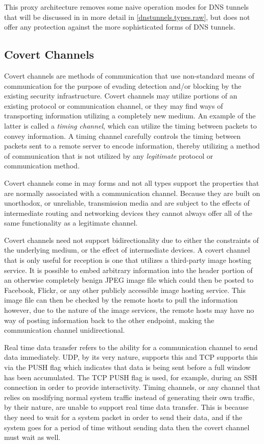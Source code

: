 \documentclass[12pt]{article}
\theoremstyle{remark}
\theoremstyle{definition}
\theoremstyle{definition}
\theoremstyle{definition}
\begin{document}
This proxy architecture removes some naive operation modes for DNS tunnels
that will be discussed in in more detail in \ref{dnstunnels.types.raw}, but does
not offer any protection against the more sophisticated forms of DNS tunnels.

\subsection{Covert Channels}

Covert channels are methods of communication that use non-standard means of
communication for the purpose of evading detection and/or blocking by the
existing security infrastructure. Covert channels may utilize
portions of an existing protocol or communication channel, or they may find
ways of transporting information utilizing a completely new medium. An example
of the latter is called a \emph{timing channel}, which can utilize the timing
between packets to convey information. A timing channel carefully controls the
timing between packets sent to a remote server to encode information, thereby
utilizing a method of communication that is not utilized by any
\emph{legitimate} protocol or communication method.

Covert channels come in may forms and not all types support the properties that
are normally associated with a communication channel. Because they are built on
unorthodox, or unreliable, transmission media and are subject to the effects of
intermediate routing and networking devices they cannot always offer all of the
same functionality as a legitimate channel.

Covert channels need not support bidirectionality due
to either the constraints of the underlying medium, or the effect of
intermediate devices. A covert channel that is only useful for reception is one
that utilizes a third-party image hosting service. It is possible to embed
arbitrary information into the header portion of an otherwise completely benign
JPEG image file which could then be posted to Facebook, Flickr, or any other
publicly accessible image hosting service. This image file can then be checked by the remote
hosts to pull the information however, due to the nature of the image services, the remote
hosts may have no
way of posting information back to the other endpoint, making the
communication channel unidirectional.

Real time data transfer refers to the ability
for a communication channel to send data immediately. UDP, by its very nature,
supports this and TCP supports this via the PUSH flag which indicates that data
is being sent before a full window has been accumulated. The TCP PUSH flag
is used, for example, during an SSH connection in order to provide
interactivity. Timing channels, or any channel that relies on modifying normal
system traffic instead of generating their own traffic, by their nature, are
unable to support real time data transfer. This is because they need to wait for
a system packet in order to send their data, and if the system goes for a period
of time without sending data then the covert channel must wait as well.
\end{document}
